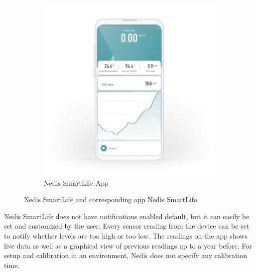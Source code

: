 \begin{figure} [H]
\begin{subfigure}{0.35\textwidth}
         \includegraphics[width=1.2\textwidth]{figures/NedisApp.jpg}
         \caption{Nedis SmartLife App \cite{Nedis}}
         \label{fig:NedisDev}
     \end{subfigure}
     \caption{Nedis SmartLife and corresponding app Nedis SmartLife}
     \label{fig:NedisBoth}
\end{figure}

Nedis SmartLife does not have notifications enabled default, but it can easily be set and customized by the user. Every sensor reading from the device can be set to notify whether levels are too high or too low. The readings on the app shows live data as well as a graphical view of previous readings up to a year before. For setup and calibration in an environment, Nedis does not specify any calibration time.  

